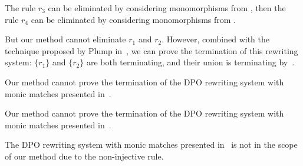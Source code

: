 \begin{example}
  The rule $r_3$ can be eliminated by considering monomorphisms from  , then the rule $r_4$ can be eliminated by considering monomorphisms from  .

But our method cannot eliminate $r_1$ and $r_2$. However, combined with the technique proposed by Plump in~\cite{plump2018modular}, we can prove the termination of this rewriting system: $\{r_1\}$ and $\{r_2\}$ are both terminating, and their union is terminating by~\cite{plump2018modular}.
\end{example}

\begin{example}
  \label{ex:bruggink2015_ex5}
  Our method cannot prove the termination of the DPO rewriting system with monic matches presented in~\cite[Example 5]{bruggink2015proving}. 
\end{example}
\begin{example}
  \label{ex:bruggink2015_ex6_endrullis2024_d2}
  Our method cannot prove the termination of the DPO rewriting system with monic matches presented in~\cite[Example 6]{bruggink2015proving}. 
\end{example}

\begin{example}
  \label{ex:plump2018_ex6_endrullis_d4}
  The DPO rewriting system with monic matches presented in~\cite[Example 6]{plump2018modular} is not in the scope of our method due to the non-injective rule.
\end{example}


